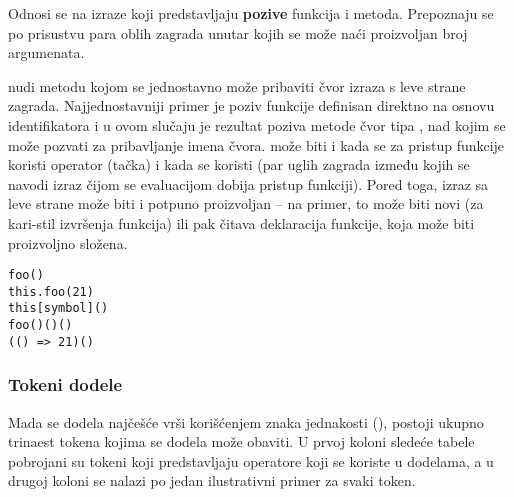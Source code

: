 Odnosi se na izraze koji predstavljaju \textbf{pozive} funkcija i metoda.
Prepoznaju se po prisustvu para oblih zagrada unutar kojih se može naći proizvoljan broj argumenata.

 nudi metodu  kojom se jednostavno može pribaviti čvor izraza s leve strane zagrada.
Najjednostavniji primer je poziv funkcije definisan direktno na osnovu identifikatora i u ovom slučaju je rezultat poziva metode  čvor tipa , nad kojim se može pozvati  za pribavljanje imena čvora.
 može biti i  kada se za pristup funkcije koristi operator  (tačka) i  kada se koristi \code{[]} (par uglih zagrada između kojih se navodi izraz čijom se evaluacijom dobija pristup funkciji).
Pored toga, izraz sa leve strane može biti i potpuno proizvoljan  -- na primer, to može biti novi  (za kari-stil izvršenja funkcija) ili pak čitava deklaracija funkcije, koja može biti proizvoljno složena.

\begin{verbatim}
foo()
this.foo(21)
this[symbol]()
foo()()()
(() => 21)()
\end{verbatim}

\subsubsection{Tokeni dodele}\label{sec:sk:tokeni-dodele}

Mada se dodela najčešće vrši korišćenjem znaka jednakosti (), postoji ukupno trinaest tokena kojima se dodela može obaviti.
U prvoj koloni sledeće tabele pobrojani su tokeni koji predstavljaju operatore koji se koriste u dodelama, a u drugoj koloni se nalazi po jedan ilustrativni primer za svaki token.

